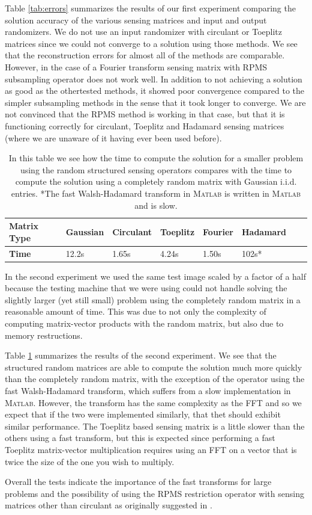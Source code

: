 Table \ref{tab:errors} summarizes the results of our first experiment comparing
the solution accuracy of the various sensing matrices and input and output
randomizers. We do not use an input randomizer with circulant or Toeplitz
matrices since we could not converge to a solution using those methods. We see
that the reconstruction errors for almost all of the methods are comparable.
However, in the case of a Fourier transform sensing matrix with RPMS
subsampling operator does not work well. In addition to not achieving a
solution as good as the othertested methods, it showed poor convergence
compared to the simpler subsampling methods in the sense that it took longer to
converge. We are not convinced that the RPMS method is working in that case,
but that it is functioning correctly for circulant, Toeplitz and Hadamard
sensing matrices (where we are unaware of it having ever been used before). 

\begin{table}[h]
  \begin{tabular}{l|lllllll} 
    \textbf{Matrix Type} & Gaussian & Circulant & Toeplitz & Fourier & Hadamard \\ \hline
    \textbf{Time}        & 12.2s    & 1.65s     & 4.24s    & 1.50s   & 102s*    \\ 
  \end{tabular}
  \label{tab:times}
  \caption{ 
    In this table we see how the time to compute the
    solution for a smaller problem using the random structured sensing
    operators compares with the time to compute the solution using a completely
    random matrix with Gaussian i.i.d. entries. *The fast Walsh-Hadamard
    transform in \textsc{Matlab} is written in \textsc{Matlab} and is slow.
  }
\end{table}

In the second experiment we used the same test image scaled by a factor of a
half because the testing machine that we were using could not handle solving
the slightly larger (yet still small) problem using the completely random
matrix in  a reasonable amount of time. This was due to not only the complexity
of computing matrix-vector products with the random matrix, but also due to
memory restructions.

Table \ref{tab:times} summarizes the results of the second experiment. We see
that the structured random matrices are able to compute the solution much
more quickly than the completely random matrix, with the exception of the
operator using the fast Walsh-Hadamard transform, which suffers from a slow
implementation in \textsc{Matlab}. However, the transform has the same
complexity as the FFT and so we expect that if the two were implemented
similarly, that thet should exhibit similar performance.  The Toeplitz based
sensing matrix is a little slower than the others using a fast transform, but
this is expected since performing a fast Toeplitz matrix-vector multiplication
requires using an FFT on a vector that is twice the size of the one you wish to
multiply. 

Overall the tests indicate the importance of the fast transforms for large
problems and the possibility of using the RPMS restriction operator with
sensing matrices other than circulant as originally suggested in
\cite{romberg2009}.
